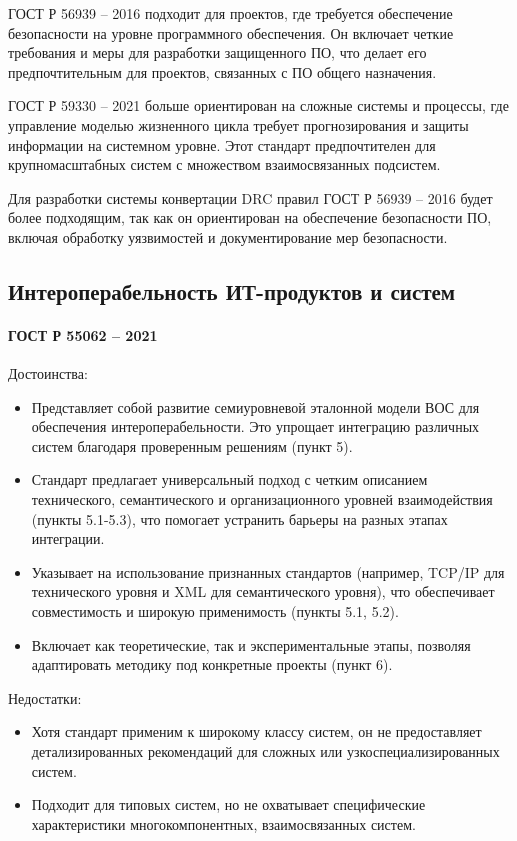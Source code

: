 ГОСТ Р 56939 -- 2016 подходит для проектов,
где требуется обеспечение безопасности на уровне программного обеспечения.
Он включает четкие требования и меры для разработки защищенного ПО,
что делает его предпочтительным для проектов,
связанных с ПО общего назначения.

ГОСТ Р 59330 -- 2021 больше ориентирован на сложные системы и процессы,
где управление моделью жизненного цикла требует прогнозирования
и защиты информации на системном уровне.
Этот стандарт предпочтителен
для крупномасштабных систем с множеством взаимосвязанных подсистем.

Для разработки системы конвертации DRC правил ГОСТ Р 56939 -- 2016
будет более подходящим, так как он ориентирован на обеспечение безопасности ПО,
включая обработку уязвимостей и документирование мер безопасности.

\subsection{Интероперабельность ИТ-продуктов и систем}

\paragraph{ГОСТ Р 55062 -- 2021}

Достоинства:

\begin{itemize}
	\item Представляет собой развитие семиуровневой эталонной модели ВОС
		для обеспечения интероперабельности.
		Это упрощает интеграцию различных
		систем благодаря проверенным решениям (пункт 5).
	\item Стандарт предлагает универсальный подход
		с четким описанием технического, семантического
		и организационного уровней взаимодействия (пункты 5.1-5.3),
		что помогает устранить барьеры на разных этапах интеграции.
	\item Указывает на использование признанных стандартов
		(например, TCP/IP для технического уровня
		и XML для семантического уровня),
		что обеспечивает совместимость
		и широкую применимость (пункты 5.1, 5.2).
	\item Включает как теоретические, так и экспериментальные этапы,
		позволяя адаптировать методику под конкретные проекты (пункт 6).
\end{itemize}

Недостатки:

\begin{itemize}
	\item Хотя стандарт применим к широкому классу систем,
		он не предоставляет детализированных рекомендаций
		для сложных или узкоспециализированных систем.
	\item Подходит для типовых систем,
		но не охватывает специфические характеристики многокомпонентных,
		взаимосвязанных систем.
\end{itemize}

